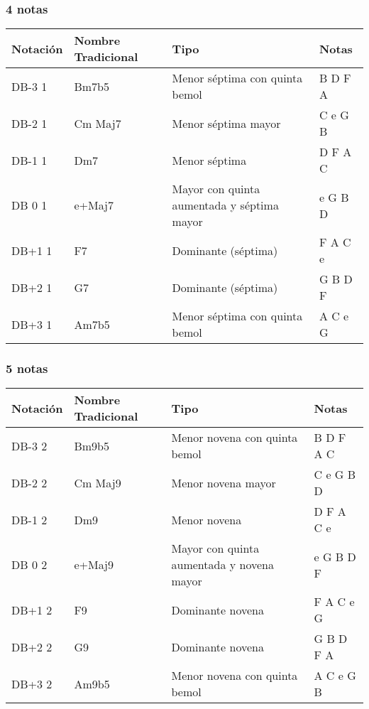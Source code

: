 \documentclass[]{article}
\begin{document}
\subsubsection*{4 notas}

\begin{table}[H]
  \centering
  \begin{tabularx}{\textwidth}{ll>{\raggedright\arraybackslash}Xl}
\toprule
Notación & Nombre Tradicional & Tipo & Notas \\
\midrule
\textsf{DB-3} 1 & Bm7b5   & Menor séptima con quinta bemol & B D F A \\
\textsf{DB-2} 1 & Cm Maj7 & Menor séptima mayor & C e G B \\
\textsf{DB-1} 1 & Dm7     & Menor séptima & D F A C \\
\textsf{DB 0} 1 & e+Maj7  & Mayor con quinta aumentada y séptima mayor & e G B D \\
\textsf{DB+1} 1 & F7      & Dominante (séptima) & F A C e \\
\textsf{DB+2} 1 & G7      & Dominante (séptima) & G B D F \\
\textsf{DB+3} 1 & Am7b5   & Menor séptima con quinta bemol & A C e G \\
\bottomrule
\end{tabularx}
\end{table}

\subsubsection*{5 notas}

\begin{table}[H]
  \centering
  \begin{tabularx}{\textwidth}{ll>{\raggedright\arraybackslash}Xl}
\toprule
Notación & Nombre Tradicional & Tipo & Notas \\
\midrule
\textsf{DB-3} 2 & Bm9b5   & Menor novena con quinta bemol & B D F A C \\
\textsf{DB-2} 2 & Cm Maj9 & Menor novena mayor & C e G B D \\
\textsf{DB-1} 2 & Dm9     & Menor novena & D F A C e \\
\textsf{DB 0} 2 & e+Maj9  & Mayor con quinta aumentada y novena mayor & e G B D F \\
\textsf{DB+1} 2 & F9      & Dominante novena & F A C e G \\
\textsf{DB+2} 2 & G9      & Dominante novena & G B D F A \\
\textsf{DB+3} 2 & Am9b5   & Menor novena con quinta bemol & A C e G B \\
\bottomrule
\end{tabularx}
\end{table}
\end{document}
